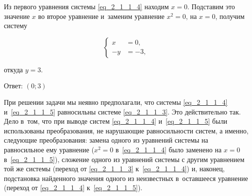 Из первого уравнения системы \eqref{eq_2_1_1_4} находим $x = 0$.
Подставим это значение $x$ во второе уравнение и~заменим уравнение $x^{2} = 0$,
на $x = 0$, получим систему

\begin{equation}\label{eq_2_1_1_5}
\begin{cases}
x &= 0, \\
-y &= -3,
\end{cases}
\end{equation}

откуда $y = 3$.

Ответ: $(0; 3)$

При решении задачи мы неявно предполагали,
что системы \eqref{eq_2_1_1_4} и~\eqref{eq_2_1_1_5}
равносильны системе \eqref{eq_2_1_1_3}.
Это действительно так. Дело в~том, что при выводе систем
\eqref{eq_2_1_1_4} и~\eqref{eq_2_1_1_5} были использованы преобразования,
не нарушающие равносильности систем, а именно, следующие преобразования:
замена одного из уравнений системы на равносильное ему уравнение ($x^{2} = 0$
в~\eqref{eq_2_1_1_4} было заменено на $x = 0$ в~\eqref{eq_2_1_1_5}),
сложение одного из уравнений системы с другим уравнением той же системы
(переход от \eqref{eq_2_1_1_3} к~\eqref{eq_2_1_1_4}) и, наконец,
подстановка найденного значения одного из неизвестных в~оставшееся
уравнение (переход от \eqref{eq_2_1_1_4} к~\eqref{eq_2_1_1_5}).

